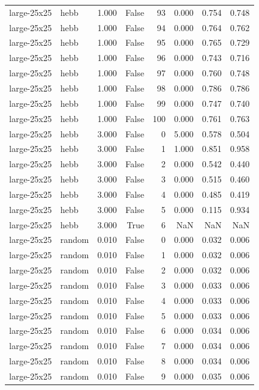 \begin{tabular}{llrrrrrr}
large-25x25 & hebb & 1.000 & False & 93 & 0.000 & 0.754 & 0.748 \\
large-25x25 & hebb & 1.000 & False & 94 & 0.000 & 0.764 & 0.762 \\
large-25x25 & hebb & 1.000 & False & 95 & 0.000 & 0.765 & 0.729 \\
large-25x25 & hebb & 1.000 & False & 96 & 0.000 & 0.743 & 0.716 \\
large-25x25 & hebb & 1.000 & False & 97 & 0.000 & 0.760 & 0.748 \\
large-25x25 & hebb & 1.000 & False & 98 & 0.000 & 0.786 & 0.786 \\
large-25x25 & hebb & 1.000 & False & 99 & 0.000 & 0.747 & 0.740 \\
large-25x25 & hebb & 1.000 & False & 100 & 0.000 & 0.761 & 0.763 \\
large-25x25 & hebb & 3.000 & False & 0 & 5.000 & 0.578 & 0.504 \\
large-25x25 & hebb & 3.000 & False & 1 & 1.000 & 0.851 & 0.958 \\
large-25x25 & hebb & 3.000 & False & 2 & 0.000 & 0.542 & 0.440 \\
large-25x25 & hebb & 3.000 & False & 3 & 0.000 & 0.515 & 0.460 \\
large-25x25 & hebb & 3.000 & False & 4 & 0.000 & 0.485 & 0.419 \\
large-25x25 & hebb & 3.000 & False & 5 & 0.000 & 0.115 & 0.934 \\
large-25x25 & hebb & 3.000 & True & 6 & NaN & NaN & NaN \\
large-25x25 & random & 0.010 & False & 0 & 0.000 & 0.032 & 0.006 \\
large-25x25 & random & 0.010 & False & 1 & 0.000 & 0.032 & 0.006 \\
large-25x25 & random & 0.010 & False & 2 & 0.000 & 0.032 & 0.006 \\
large-25x25 & random & 0.010 & False & 3 & 0.000 & 0.033 & 0.006 \\
large-25x25 & random & 0.010 & False & 4 & 0.000 & 0.033 & 0.006 \\
large-25x25 & random & 0.010 & False & 5 & 0.000 & 0.033 & 0.006 \\
large-25x25 & random & 0.010 & False & 6 & 0.000 & 0.034 & 0.006 \\
large-25x25 & random & 0.010 & False & 7 & 0.000 & 0.034 & 0.006 \\
large-25x25 & random & 0.010 & False & 8 & 0.000 & 0.034 & 0.006 \\
large-25x25 & random & 0.010 & False & 9 & 0.000 & 0.035 & 0.006 \\

\end{tabular}
